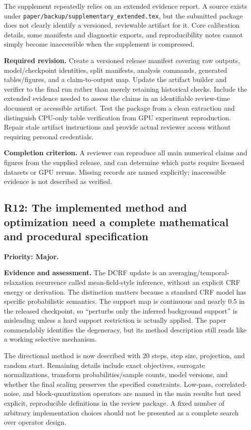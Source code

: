 \documentclass[11pt,a4paper]{article}
\newcommand{\finding}[3]{\subsection{#1: #3}\label{rev:#1}\textbf{Priority: #2.}}
\newcommand{\file}[1]{\nolinkurl{#1}}
\newcommand{\evidence}{\par\textbf{Evidence and assessment.} }
\newcommand{\action}{\par\textbf{Required revision.} }
\newcommand{\acceptance}{\par\textbf{Completion criterion.} }
\begin{document}
The supplement repeatedly relies on an extended evidence report. A source exists under \file{paper/backup/supplementary_extended.tex}, but the submitted package does not clearly identify a versioned, reviewable artifact for it. Core calibration details, some manifests and diagnostic exports, and reproducibility notes cannot simply become inaccessible when the supplement is compressed.

\action
Create a versioned release manifest covering raw outputs, model/checkpoint identities, split manifests, analysis commands, generated tables/figures, and a claim-to-output map. Update the artifact builder and verifier to the final run rather than merely retaining historical checks. Include the extended evidence needed to assess the claims in an identifiable review-time document or accessible artifact. Test the package from a clean extraction and distinguish CPU-only table verification from GPU experiment reproduction. Repair stale artifact instructions and provide actual reviewer access without requiring personal credentials.
\acceptance
A reviewer can reproduce all main numerical claims and figures from the supplied release, and can determine which parts require licensed datasets or GPU reruns. Missing records are named explicitly; inaccessible evidence is not described as verified.

\finding{R12}{Major}{The implemented method and optimization need a complete mathematical and procedural specification}
\evidence
The DCRF update is an averaging/temporal-relaxation recurrence called mean-field-style inference, without an explicit CRF energy or derivation. The distinction matters because a standard CRF model has specific probabilistic semantics. The support map is continuous and nearly 0.5 in the released checkpoint, so ``perturbs only the inferred background support'' is misleading unless a hard support restriction is actually applied. The paper commendably identifies the degeneracy, but its method description still reads like a working selective mechanism.

The directional method is now described with 20 steps, step size, projection, and random start. Remaining details include exact objectives, surrogate normalizations, transform probabilities/sample counts, model versions, and whether the final scaling preserves the specified constraints. Low-pass, correlated-noise, and block-quantization operators are named in the main results but need explicit, reproducible definitions in the review package. A fixed number of arbitrary implementation choices should not be presented as a complete search over operator design.
\end{document}
